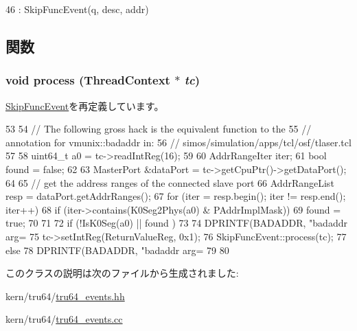 \begin{DoxyCode}
46         : SkipFuncEvent(q, desc, addr) {}
\end{DoxyCode}


\subsection{関数}
\hypertarget{classBadAddrEvent_ad66a9d5ec7cfe597b848a17c0df5cc28}{
\subsubsection[{process}]{\setlength{\rightskip}{0pt plus 5cm}void process ({\bf ThreadContext} $\ast$ {\em tc})}}
\label{classBadAddrEvent_ad66a9d5ec7cfe597b848a17c0df5cc28}


\hyperlink{classSkipFuncEvent_ad66a9d5ec7cfe597b848a17c0df5cc28}{SkipFuncEvent}を再定義しています。


\begin{DoxyCode}
53 {
54     // The following gross hack is the equivalent function to the
55     // annotation for vmunix::badaddr in:
56     // simos/simulation/apps/tcl/osf/tlaser.tcl
57 
58     uint64_t a0 = tc->readIntReg(16);
59 
60     AddrRangeIter iter;
61     bool found = false;
62 
63     MasterPort &dataPort = tc->getCpuPtr()->getDataPort();
64 
65     // get the address ranges of the connected slave port
66     AddrRangeList resp = dataPort.getAddrRanges();
67     for (iter = resp.begin(); iter != resp.end(); iter++) {
68         if (iter->contains(K0Seg2Phys(a0) & PAddrImplMask))
69             found = true;
70     }
71 
72     if (!IsK0Seg(a0) || found ) {
73 
74         DPRINTF(BADADDR, "badaddr arg=%
75         tc->setIntReg(ReturnValueReg, 0x1);
76         SkipFuncEvent::process(tc);
77     } else {
78         DPRINTF(BADADDR, "badaddr arg=%
79     }
80 }
\end{DoxyCode}


このクラスの説明は次のファイルから生成されました:\begin{DoxyCompactItemize}
\item 
kern/tru64/\hyperlink{tru64__events_8hh}{tru64\_\-events.hh}\item 
kern/tru64/\hyperlink{tru64__events_8cc}{tru64\_\-events.cc}\end{DoxyCompactItemize}
